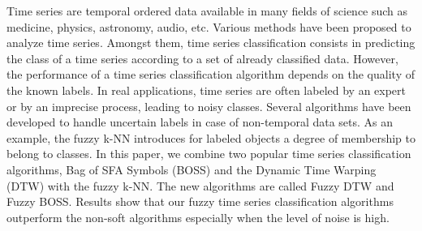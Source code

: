 
Time series are temporal ordered data available in many fields of science such as medicine, physics, astronomy, audio, etc. Various methods have been proposed to analyze time series. Amongst them, time series classification consists in predicting the class of a time series according to a set of already classified data. However, the performance of a time series classification algorithm depends on the quality of the known labels.  In real applications, time series are often labeled by an expert or by an imprecise process, leading to noisy classes. Several algorithms have been developed to handle uncertain labels in case of non-temporal data sets. As an example, the fuzzy k-NN introduces for labeled objects a degree of membership to belong to classes. In this paper, we combine two popular time series classification algorithms, Bag of SFA Symbols (BOSS) and the Dynamic Time Warping (DTW) with the fuzzy k-NN. The new algorithms are called Fuzzy DTW and Fuzzy BOSS. Results show that our fuzzy time series classification algorithms outperform the non-soft algorithms especially when the level of noise is high.



